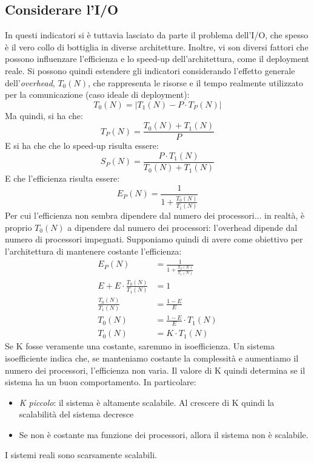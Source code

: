 \subsection{Considerare l'I/O}
In questi indicatori si è tuttavia lasciato da parte il problema dell'I/O, che spesso è il vero collo di bottiglia in
diverse architetture. Inoltre, vi son diversi fattori che possono influenzare l'efficienza e lo speed-up
dell'architettura, come il deployment reale. Si possono quindi estendere gli indicatori considerando l'effetto
generale dell'\textit{overhead}, $T_0(N)$, che rappresenta le risorse e il tempo
realmente utilizzato per la comunicazione
(caso ideale di deployment):
\begin{equation}
T_0(N) = \left|T_1(N) - P \cdot T_P(N)\right|
\end{equation}
Ma quindi, si ha che:
\begin{equation}
 T_P(N) = \frac{T_0(N) + T_1(N)}{P}
\end{equation}
E si ha che che lo speed-up risulta essere:
\begin{equation}
 S_P(N) = \frac{P \cdot T_1(N)}{T_0(N) + T_1(N)}
\end{equation}
E che l'efficienza risulta essere:
\begin{equation}
E_P(N) = \frac{1}{1 + \frac{T_0(N)}{T_1(N)}}
\end{equation}
Per cui l'efficienza non sembra dipendere dal numero dei processori... in realtà,
è proprio $T_0(N)$ a dipendere dal numero dei processori: l'overhead dipende dal numero di processori impegnati.
Supponiamo quindi di avere come obiettivo per l'architettura di mantenere costante l'efficienza:
\begin{align}
                            E_P(N) &= \frac{1}{1 + \frac{T_0(N)}{T_1(N)}} \nonumber \\
 E + E \cdot \frac{T_0(N)}{T_1(N)} &= 1                                   \nonumber \\
             \frac{T_0(N)}{T_1(N)} &= \frac{1 - E}{E}                     \nonumber \\
                            T_0(N) &= \frac{1 - E}{E} \cdot T_1(N)        \nonumber \\
                            T_0(N) &= K \cdot T_1(N)
\end{align}
Se K fosse veramente una costante, saremmo in isoefficienza. Un sistema isoefficiente indica che, se manteniamo
costante la complessità e aumentiamo il numero dei processori, l'efficienza non varia. Il valore di K quindi determina
se il sistema ha un buon comportamento. In particolare:
\begin{itemize}
 \item \textit{K piccolo}: il sistema è altamente scalabile. Al crescere di K quindi la scalabilità del sistema decresce
 \item Se non è costante ma funzione dei processori, allora il sistema non è scalabile.
\end{itemize}
I sistemi reali sono scarsamente scalabili.
